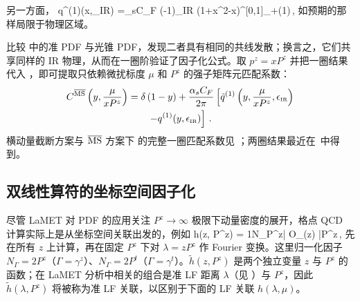 另一方面，
\beq\label{eq:lcpdf}
q^{(1)}(x,\epsilon_{\mbox{\tiny IR}}) ={\alpha_sC_F\pi} {(-1)\over \epsilon_{\mbox{\tiny IR}}} \left({1+x^2-x}\right)^{[0,1]}_{+(1)}\,,
\eeq
如预期的那样局限于物理区域。

比较  中的准 PDF 与光锥 PDF，发现二者具有相同的共线发散；换言之，它们共享同样的 IR 物理，从而在一圈阶验证了因子化公式。取 $p^z=xP^z$ 并把一圈结果代入 ，即可提取只依赖微扰标度 $\mu$ 和 $P^z$ 的强子矩阵元匹配系数：
\begin{align}\label{eq:msbarmatching}
	C^{{\overline{\rm MS}}}\left(y, {\mu\over xP^z}\right) &= \delta\left(1-y\right) + {\alpha_sC_F\over 2\pi}\left[\tilde q^{(1)}\left(y,{\mu\over xP^z}, \epsilon_{\mbox{\tiny IR}}\right)\right.\nonumber\\
	&\qquad\left.-q^{(1)}(y,\epsilon_{\mbox{\tiny IR}})\right]\,.
\end{align}
横动量截断方案与 ${\overline{\rm MS}}$ 方案下  的完整一圈匹配系数见 \cite{Wang:2017qyg,Wang:2017eel,Wang:2019tgg}；两圈结果最近在~\cite{Chen:2020arf,Chen:2020iqi,Chen:2020ody,Li:2020xml}中得到。

\subsection{双线性算符的坐标空间因子化}
\label{sec:renorm-coord}
尽管 LaMET 对 PDF 的应用关注 $P^z\to\infty$ 极限下动量密度的展开，格点 QCD 计算实际上是从坐标空间关联出发的，例如
\beq
\tilde h(z, P^z) = {1\over N_\Gamma}\langle P^z| O_\Gamma(z) |P^z\rangle\,,
\eeq
先在所有 $z$ 上计算，再在固定 $P^z$ 下对 $\lambda=zP^z$ 作 Fourier 变换。这里归一化因子 $N_\Gamma=2P^z$（$\Gamma=\gamma^z$）、$N_\Gamma=2P^t$（$\Gamma=\gamma^t$）。$\tilde h(z,P^z)$ 是两个独立变量 $z$ 与 $P^z$ 的函数；在 LaMET 分析中相关的组合是准 LF 距离 $\lambda$（见 ）与 $P^z$，因此 $\tilde h(\lambda, P^z)$ 将被称为准 LF 关联，以区别于下面的 LF 关联 $h(\lambda,\mu)$。

